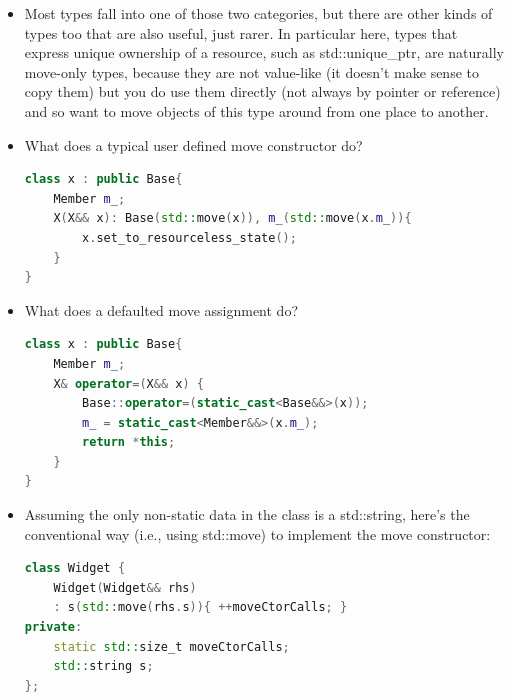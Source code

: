 \documentclass[a4paper,11pt,twoside]{book}
\begin{document}
\begin{itemize}
	\item Most types fall into one of those two categories, but there are other kinds of types too that are also useful, just rarer. In particular here, types that express unique ownership of a resource, such as std::unique\_ptr, are naturally move-only types, because they are not value-like (it doesn't make sense to copy them) but you do use them directly (not always by pointer or reference) and so want to move objects of this type around from one place to another.
	
	\item What does a typical user defined move constructor do?
\begin{lstlisting}[frame=single, language=c++]
class x : public Base{
	Member m_;
	X(X&& x): Base(std::move(x)), m_(std::move(x.m_)){
		x.set_to_resourceless_state();
	}
}
	\end{lstlisting}
	
	\item What does a defaulted move assignment do?
	\begin{lstlisting}[frame=single, language=c++]
class x : public Base{
	Member m_;
	X& operator=(X&& x) {
		Base::operator=(static_cast<Base&&>(x));
		m_ = static_cast<Member&&>(x.m_);
		return *this;
	}
}
	\end{lstlisting}
	
	
	\item Assuming the only non-static data in the class is a std::string, here's the conventional way (i.e., using std::move) to implement the move constructor:
\begin{lstlisting}[frame=single, language=c++]
class Widget {
	Widget(Widget&& rhs)
	: s(std::move(rhs.s)){ ++moveCtorCalls; }
private:
	static std::size_t moveCtorCalls;
	std::string s;
};
\end{lstlisting}
\end{itemize}
\end{document}
